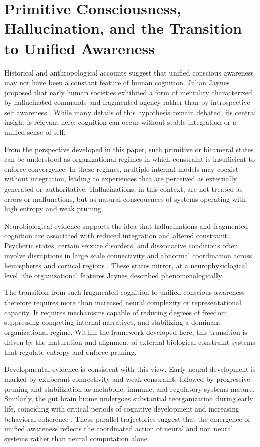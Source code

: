 \documentclass[12pt,letterpaper]{article}
\begin{document}
\section{Primitive Consciousness, Hallucination, and the Transition to Unified Awareness}

Historical and anthropological accounts suggest that unified conscious awareness may not have been a constant feature of human cognition. Julian Jaynes proposed that early human societies exhibited a form of mentality characterized by hallucinated commands and fragmented agency rather than by introspective self awareness \cite{jaynes1976}. While many details of this hypothesis remain debated, its central insight is relevant here: cognition can occur without stable integration or a unified sense of self.

From the perspective developed in this paper, such primitive or bicameral states can be understood as organizational regimes in which constraint is insufficient to enforce convergence. In these regimes, multiple internal models may coexist without integration, leading to experiences that are perceived as externally generated or authoritative. Hallucinations, in this context, are not treated as errors or malfunctions, but as natural consequences of systems operating with high entropy and weak pruning.

Neurobiological evidence supports the idea that hallucinations and fragmented cognition are associated with reduced integration and altered constraint. Psychotic states, certain seizure disorders, and dissociative conditions often involve disruptions in large scale connectivity and abnormal coordination across hemispheres and cortical regions \cite{friston2012, northoff2018}. These states mirror, at a neurophysiological level, the organizational features Jaynes described phenomenologically.

The transition from such fragmented cognition to unified conscious awareness therefore requires more than increased neural complexity or representational capacity. It requires mechanisms capable of reducing degrees of freedom, suppressing competing internal narratives, and stabilizing a dominant organizational regime. Within the framework developed here, this transition is driven by the maturation and alignment of external biological constraint systems that regulate entropy and enforce pruning.

Developmental evidence is consistent with this view. Early neural development is marked by exuberant connectivity and weak constraint, followed by progressive pruning and stabilization as metabolic, immune, and regulatory systems mature. Similarly, the gut brain biome undergoes substantial reorganization during early life, coinciding with critical periods of cognitive development and increasing behavioral coherence \cite{kundu2017, johnson2018}. These parallel trajectories suggest that the emergence of unified awareness reflects the coordinated action of neural and non neural systems rather than neural computation alone.
\end{document}
